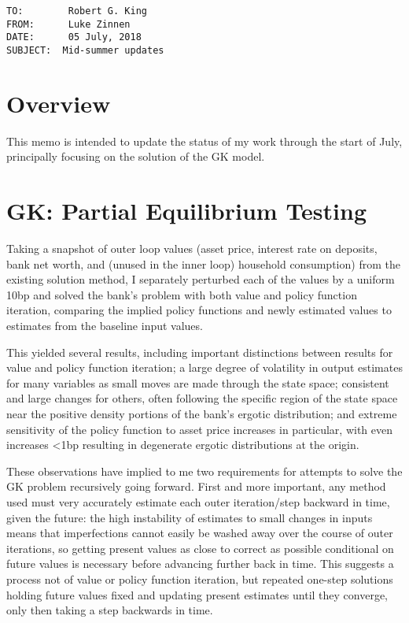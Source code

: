 \documentclass[english]{article}
\begin{document}
\begin{verbatim}
TO:        Robert G. King
FROM:      Luke Zinnen
DATE:      05 July, 2018
SUBJECT:  Mid-summer updates
\end{verbatim}

\section{Overview}
This memo is intended to update the status of my work through the start of July, principally focusing 
on the solution of the GK model.

\section{GK: Partial Equilibrium Testing}
Taking a snapshot of outer loop values (asset price, interest rate on deposits, bank net worth, and (unused in the inner loop) household 
consumption) from the existing solution method, I separately  perturbed each of the values by a uniform 
10bp and solved the bank's problem with both value and policy function iteration, comparing the implied 
policy functions and newly estimated values to estimates from the baseline input values. 

This yielded several results, including important distinctions between results for value and policy 
function iteration; a large degree of volatility in output estimates for many variables as small moves are 
made through the state space; consistent and large changes for others, often following the specific 
region of the state space near the positive density portions of the bank's ergotic distribution; and extreme 
sensitivity of the policy function to asset price increases in particular, with even increases <1bp 
resulting in degenerate ergotic distributions at the origin.

These observations have implied to me two requirements for attempts to solve the GK problem recursively 
going forward. First and more important, any method used must very accurately estimate each outer 
iteration/step backward in time, given the future: the high instability of estimates to small changes in 
inputs means that imperfections cannot easily be washed away over the course of outer iterations, so 
getting present values as close to correct as possible conditional on future values is necessary before 
advancing further back in time. This suggests a process not of value or policy function iteration, but 
repeated one-step solutions holding future values fixed and updating present estimates until they converge, 
only then taking a step backwards in time. 
\end{document}
